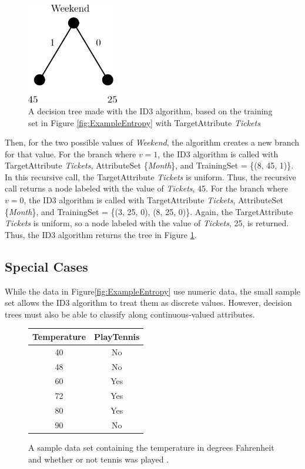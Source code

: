 \begin{figure}[H]
  \centering
  \includegraphics[width=4cm]{figures/ID3Example.png}
  \caption{A decision tree made with the ID3 algorithm, based on the training set in Figure \ref{fig:ExampleEntropy} with TargetAttribute \textit{Tickets}}
  \label{fig:ID3Example}
\end{figure}
Then, for the two possible values of \textit{Weekend}, the algorithm creates a new branch for that value. For the branch where $v=1$, the ID3 algorithm is called with TargetAttribute \textit{Tickets}, AttributeSet \{\textit{Month}\}, and TrainingSet = \{(8, 45, 1)\}. In this recursive call, the TargetAttribute \textit{Tickets} is uniform. Thus, the recursive call returns a node labeled with the value of \textit{Tickets}, 45. For the branch where $v=0$, the ID3 algorithm is called with TargetAttribute \textit{Tickets}, AttributeSet \{\textit{Month}\}, and TrainingSet = \{(3, 25, 0), (8, 25, 0)\}. Again, the TargetAttribute \textit{Tickets} is uniform, so a node labeled with the value of \textit{Tickets}, 25, is returned. Thus, the ID3 algorithm returns the tree in Figure \ref{fig:ID3Example}.\\

\subsection{Special Cases}
While the data in Figure\ref{fig:ExampleEntropy} use numeric data, the small sample set allows the ID3 algorithm to treat them as discrete values. However, decision trees must also be able to classify along continuous-valued attributes.
\begin{figure}[H]
  \centering
  \begin{tabular}{| c | c |}
    Temperature & PlayTennis \\ \hline
    40 & No \\ \hline
    48 & No \\ \hline
    60 & Yes \\ \hline
    72 & Yes \\ \hline
    80 & Yes \\ \hline
    90 & No \\ \hline
  \end{tabular}
  \caption{A sample data set containing the temperature in degrees Fahrenheit and whether or not tennis was played \cite{mitc97}.}
  \label{fig:rangedValue}
\end{figure}

